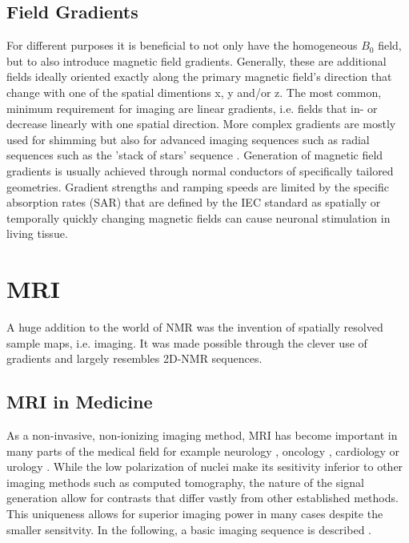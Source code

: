         \subsection{Field Gradients}
            \label{section:theory:magneticGradient}
            For different purposes it is beneficial to not only have the homogeneous $B_0$ field, but to also introduce magnetic field gradients. Generally, these are additional fields ideally oriented exactly along the primary magnetic field's direction that change with one of the spatial dimentions x, y and/or z. The most common, minimum requirement for imaging are linear gradients, i.e. fields that in- or decrease linearly with one spatial direction. More complex gradients \cite{littin_development_2018} are mostly used for shimming \cite{kim_regularized_2002} but also for advanced imaging sequences such as radial sequences such as the 'stack of stars' sequence \cite{burdumy_one-second_2016}. Generation of magnetic field gradients is usually achieved through normal conductors of specifically tailored geometries. Gradient strengths and ramping speeds are limited by the specific absorption rates (SAR) that are defined by the IEC standard \cite{noauthor_iec_nodate} as spatially or temporally quickly changing magnetic fields can cause neuronal stimulation in living tissue.
    \section{MRI}
    \label{theory:section:MRI}
        A huge addition to the world of NMR was the invention of spatially resolved sample maps, i.e. imaging. It was made possible through the clever use of gradients and largely resembles 2D-NMR sequences.
        \subsection{MRI in Medicine}
        As a non-invasive, non-ionizing imaging method, MRI has become important in many parts of the medical field for example neurology \cite{frisoni_clinical_2010}, oncology \cite{padhani_dynamic_2002}, cardiology \cite{constantine_role_2004} or urology \cite{stoianovici_mri_2007}. While the low polarization of nuclei make its sesitivity inferior to other imaging methods such as computed tomography, the nature of the signal generation allow for contrasts that differ vastly from other established methods. This uniqueness allows for superior imaging power in many cases despite the smaller sensitvity. In the following, a basic imaging sequence is described \cite{noauthor_wiley-vch_nodate}.
